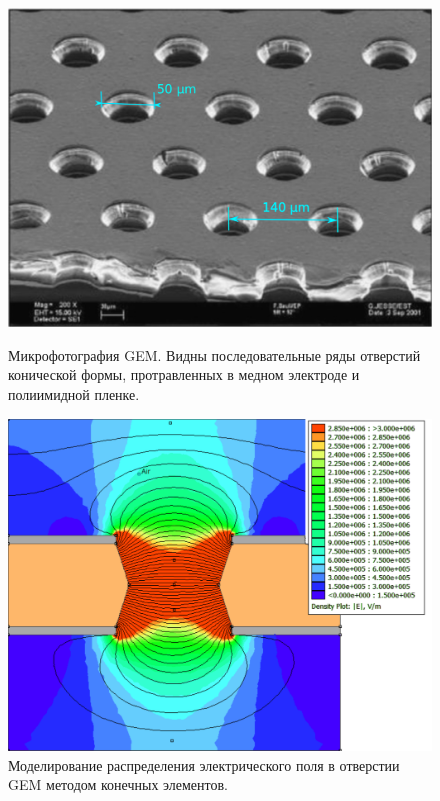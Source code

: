  \begin{figure}[h]
 	\centering
 	\begin{minipage}{.45\textwidth}
 	\centering
 	\includegraphics[width=1\linewidth]{img/GEM_microphoto.png}
 	\caption{Микрофотография GEM. Видны последовательные ряды отверстий конической формы, протравленных в медном электроде и полиимидной пленке.}
 	\end{minipage}
 	\hspace{20pt}
 	\begin{minipage}{.45\textwidth}
 			\centering
 		\includegraphics[width=1\linewidth]{img/GEM_field.pdf}
 		\caption{Моделирование распределения электрического поля в отверстии GEM методом конечных элементов.}
 	\end{minipage}
 \end{figure}
